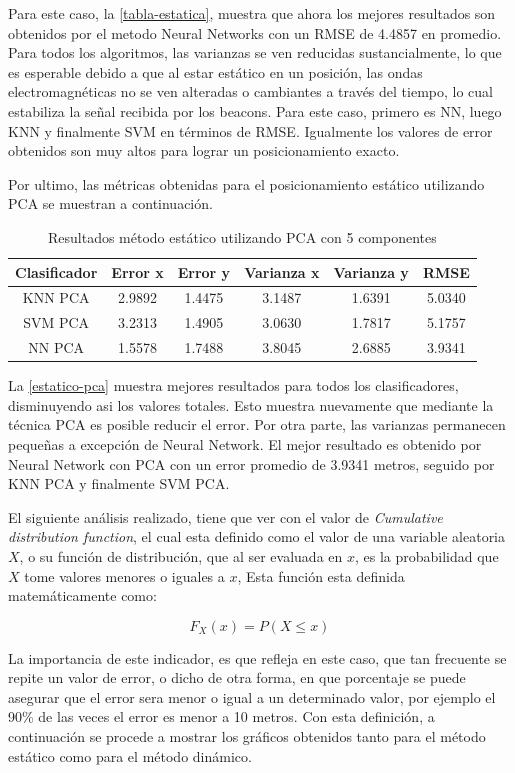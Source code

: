 Para este caso, la \autoref{tabla-estatica}, muestra que ahora los mejores resultados son obtenidos por el metodo Neural Networks con un RMSE de 4.4857 en promedio. Para todos los algoritmos, las varianzas se ven reducidas sustancialmente, lo que es esperable debido a que al estar estático en un posición, las ondas electromagnéticas no se ven alteradas o cambiantes a través del tiempo, lo cual estabiliza la señal recibida por los beacons. Para este caso, primero es NN, luego KNN y finalmente SVM en términos de RMSE. Igualmente los valores de error obtenidos son muy altos para lograr un posicionamiento exacto.

Por ultimo, las métricas obtenidas para el posicionamiento estático utilizando PCA se muestran a continuación.

\begin{table}[!h]
\centering
\caption{Resultados método estático utilizando PCA con 5 componentes}
\label{estatico-pca}
\begin{tabular}{|c|c|c|c|c|c|}
\hline
Clasificador & Error x & Error y & Varianza x & Varianza y & RMSE   \\ \hline
KNN PCA      & 2.9892  & 1.4475  & 3.1487     & 1.6391     & 5.0340 \\ \hline
SVM PCA      & 3.2313  & 1.4905  & 3.0630     & 1.7817     & 5.1757 \\ \hline
NN PCA       & 1.5578  & 1.7488  & 3.8045    & 2.6885     & 3.9341 \\ \hline
\end{tabular}
\end{table}
 
La \autoref{estatico-pca} muestra mejores resultados para todos los clasificadores, disminuyendo asi los valores totales. Esto muestra nuevamente que mediante la técnica PCA es posible reducir el error. Por otra parte, las varianzas permanecen pequeñas a excepción de Neural Network. El mejor resultado es obtenido por Neural Network con PCA con un error promedio de 3.9341 metros, seguido por KNN PCA y finalmente SVM PCA.

El siguiente análisis realizado, tiene que ver con el valor de \textit{Cumulative distribution function}, el cual esta definido como el valor de una variable aleatoria $X$, o su función de distribución, que al ser evaluada en $x$, es la probabilidad que $X$ tome valores menores o iguales a $x$, Esta función esta definida matemáticamente como:

$$ F_{X} (x) = P(X \le x)$$

La importancia de este indicador, es que refleja en este caso, que tan frecuente se repite un valor de error, o dicho de otra forma, en que porcentaje se puede asegurar que el error sera menor o igual a un determinado valor, por ejemplo el 90\% de las veces el error es menor a 10 metros. Con esta definición, a continuación se procede a mostrar los gráficos obtenidos tanto para el método estático como para el método dinámico.

